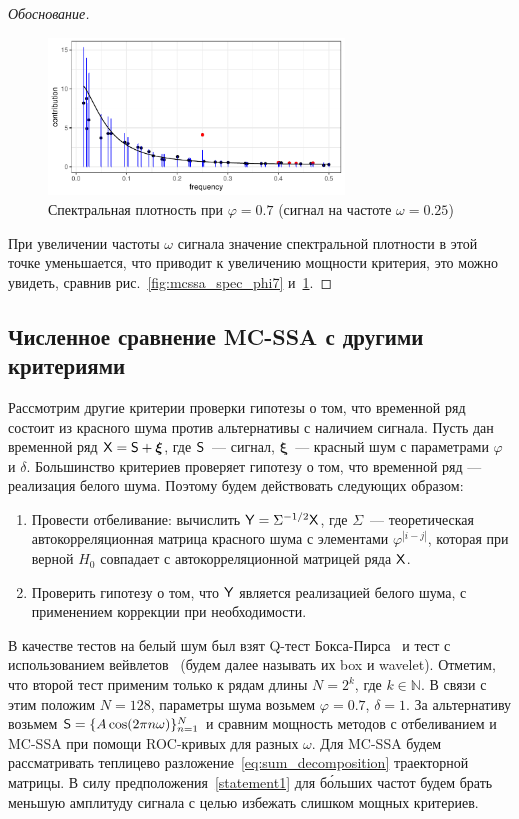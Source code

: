 \documentclass[specialist,
substylefile = spbu.rtx,
               subf,href,colorlinks=true, 12pt]{disser}
\theoremstyle{definition}
\newcommand{\bfxi}{\boldsymbol{\xi}}
\begin{document}
\begin{proof}[Обоснование]
\begin{figure}[h]
	\end{figure}
	\begin{figure}[H]
		\centering
		\includegraphics[width=0.7\textwidth]{img/mcssa_spec_phi7_omega025.pdf}
		\caption{Спектральная плотность при $\varphi=0.7$ (сигнал на частоте $\omega=0.25$)}
		\label{fig:mcssa_spec_phi7_omega025}
	\end{figure}
	При увеличении частоты $\omega$ сигнала значение спектральной плотности в этой точке уменьшается, что приводит к увеличению мощности критерия, это можно увидеть, сравнив рис.~\ref{fig:mcssa_spec_phi7} и~\ref{fig:mcssa_spec_phi7_omega025}.
\end{proof}

\subsection{Численное сравнение MC-SSA с другими критериями}\label{sect:mc-ssa_comparison}
Рассмотрим другие критерии проверки гипотезы о том, что временной ряд состоит из красного шума против альтернативы с наличием сигнала. Пусть дан временной ряд $\tX=\tS+\bfxi$, где $\mathsf{S}$~--- сигнал, $\bfxi$~--- красный шум с параметрами $\varphi$ и $\delta$. Большинство критериев проверяет гипотезу о том, что временной ряд --- реализация белого шума. Поэтому будем действовать следующих образом:
\begin{enumerate}
	\item Провести отбеливание: вычислить $\mathsf{Y}=\Sigma^{-1/2}\mathsf{X}$, где $\Sigma$~--- теоретическая автокорреляционная матрица красного шума с элементами $\varphi^{|i-j|}$, которая при верной $H_0$ совпадает с автокорреляционной матрицей ряда $\mathsf{X}$.
	\item Проверить гипотезу о том, что $\mathsf{Y}$ является реализацией белого шума, с применением коррекции при необходимости.
\end{enumerate}
В качестве тестов на белый шум был взят Q-тест Бокса-Пирса~\cite{Box1970} и тест с использованием вейвлетов~\cite{Nason2014} (будем далее называть их box и wavelet). Отметим, что второй тест применим только к рядам длины $N=2^k$, где $k\in\mathbb{N}$. В связи с этим положим $N=128$, параметры шума возьмем $\varphi=0.7$, $\delta=1$. За альтернативу возьмем $\mathsf{S}=\{A\cos(2\pi n\omega)\}_{n=1}^N$ и сравним мощность методов с отбеливанием и MC-SSA при помощи ROC-кривых для разных $\omega$. Для MC-SSA будем рассматривать теплицево разложение~\eqref{eq:sum_decomposition} траекторной матрицы. В силу предположения~\ref{statement1} для б\'{о}льших частот будем брать меньшую амплитуду сигнала с целью избежать слишком мощных критериев.
\end{document}
